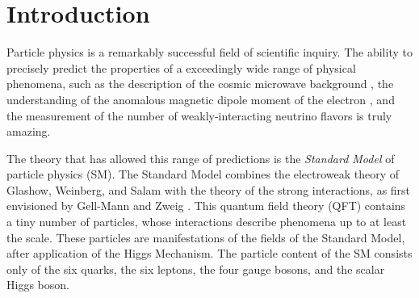 
\chapter{Introduction}


Particle physics is a remarkably successful field of scientific inquiry.
The ability to precisely predict the properties of a exceedingly wide range of physical phenomena, such as the description of the cosmic microwave background \cite{Perdereau:2016akt,Aghanim:2016sns}, the understanding of the anomalous magnetic dipole moment of the electron \cite{Schwinger:1948iu, Laporta:1996mq}, and the measurement of the number of weakly-interacting neutrino flavors \cite{ALEPH:2005ab} is truly amazing.

The theory that has allowed this range of predictions is the \textit{Standard Model} of particle physics (SM).
The Standard Model combines the electroweak theory of Glashow, Weinberg, and Salam \cite{Glashow:1961tr, Weinberg:1967tq,  Salam:1968rm} with the theory of the strong interactions, as first envisioned by Gell-Mann and Zweig \cite{GellMann:1964nj, Zweig:1964jf}.
This quantum field theory (QFT) contains a tiny number of particles, whose interactions describe phenomena up to at least the \TeV\xspace scale.
These particles are manifestations of the fields of the Standard Model, after application of the Higgs Mechanism.
The particle content of the SM consists only of the six quarks, the six leptons, the four gauge bosons, and the scalar Higgs boson.

